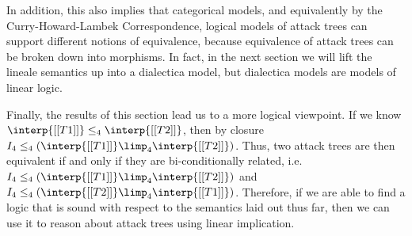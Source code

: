 In addition, this also implies that categorical models, and
equivalently by the Curry-Howard-Lambek Correspondence, logical models
of attack trees can support different notions of equivalence, because
equivalence of attack trees can be broken down into morphisms.  In
fact, in the next section we will lift the lineale semantics up into a
dialectica model, but dialectica models are models of linear logic.

Finally, the results of this section lead us to a more logical
viewpoint.  If we know $\interp{[[T1]]} \leq_4 \interp{[[T2]]}$, then
by closure $I_4 \leq_4 (\interp{[[T1]]} \limp_4 \interp{[[T2]]})$.
Thus, two attack trees are then equivalent if and only if they are
bi-conditionally related, i.e. $I_4 \leq_4 (\interp{[[T1]]} \limp_4
\interp{[[T2]]})$ and $I_4 \leq_4 (\interp{[[T2]]} \limp_4
\interp{[[T1]]})$.  Therefore, if we are able to find a logic that is
sound with respect to the semantics laid out thus far, then we can use
it to reason about attack trees using linear implication.

